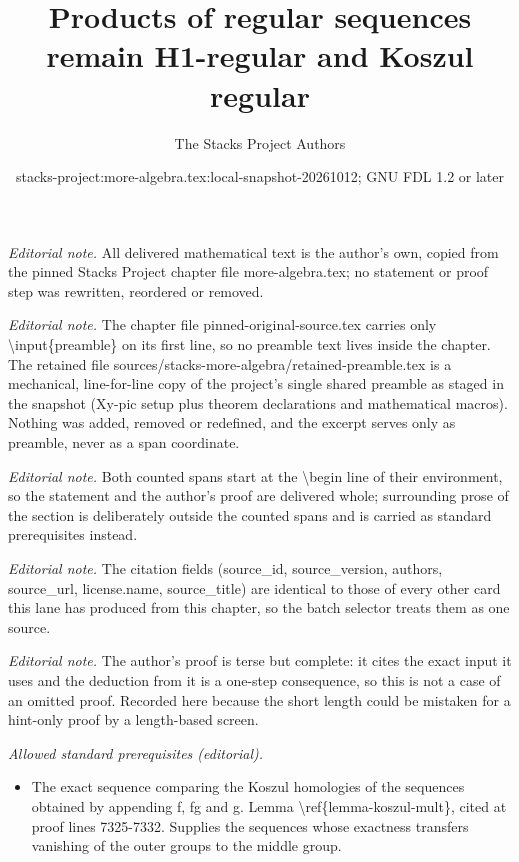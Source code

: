 \documentclass[10pt,a4paper]{amsart}
\title{Products of regular sequences remain H1-regular and Koszul regular}
\author{The Stacks Project Authors}
\date{stacks-project:more-algebra.tex:local-snapshot-20261012; GNU FDL 1.2 or later}
\theoremstyle{plain}
\theoremstyle{definition}
\theoremstyle{remark}
\numberwithin{equation}{subsection}
\begin{document}
\maketitle
\setcounter{subsection}{1}
\noindent\textit{Editorial note.} All delivered mathematical text is the author's own, copied from the pinned Stacks Project chapter file more-algebra.tex; no statement or proof step was rewritten, reordered or removed.\par\medskip
\noindent\textit{Editorial note.} The chapter file pinned-original-source.tex carries only \textbackslash{}input\{preamble\} on its first line, so no preamble text lives inside the chapter. The retained file sources/stacks-more-algebra/retained-preamble.tex is a mechanical, line-for-line copy of the project's single shared preamble as staged in the snapshot (Xy-pic setup plus theorem declarations and mathematical macros). Nothing was added, removed or redefined, and the excerpt serves only as preamble, never as a span coordinate.\par\medskip
\noindent\textit{Editorial note.} Both counted spans start at the \textbackslash{}begin line of their environment, so the statement and the author's proof are delivered whole; surrounding prose of the section is deliberately outside the counted spans and is carried as standard prerequisites instead.\par\medskip
\noindent\textit{Editorial note.} The citation fields (source\_id, source\_version, authors, source\_url, license.name, source\_title) are identical to those of every other card this lane has produced from this chapter, so the batch selector treats them as one source.\par\medskip
\noindent\textit{Editorial note.} The author's proof is terse but complete: it cites the exact input it uses and the deduction from it is a one-step consequence, so this is not a case of an omitted proof. Recorded here because the short length could be mistaken for a hint-only proof by a length-based screen.\par\medskip
\noindent\textit{Allowed standard prerequisites (editorial).}\begin{itemize}
\item The exact sequence comparing the Koszul homologies of the sequences obtained by appending f, fg and g. Lemma \textbackslash{}ref\{lemma-koszul-mult\}, cited at proof lines 7325-7332. Supplies the sequences whose exactness transfers vanishing of the outer groups to the middle group.
\end{itemize}\medskip
\end{document}
